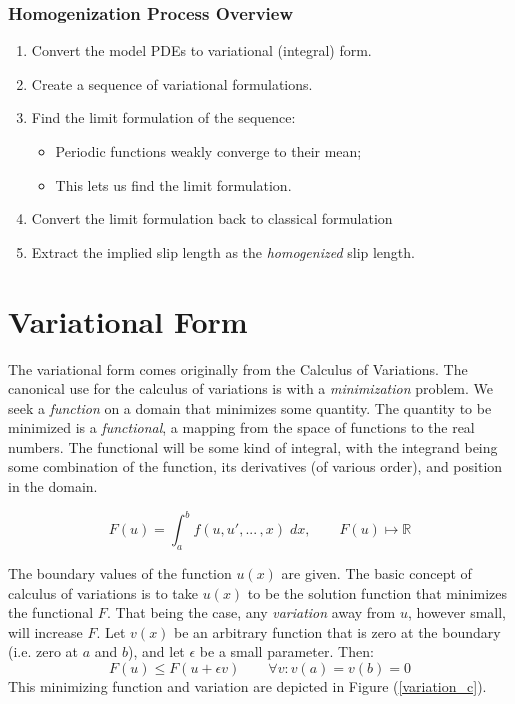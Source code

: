 \documentclass[12pt, a4paper, twoside, openright]{book}
\begin{document}
\subsubsection{Homogenization Process Overview}

\begin{enumerate}
\item Convert the model PDEs to variational (integral) form.
\item Create a sequence of variational formulations.
\item Find the limit formulation of the sequence:
\begin{itemize}
    \item Periodic functions weakly converge to their mean;
    \item This lets us find the limit formulation.
\end{itemize}
      
\item Convert the limit formulation back to classical formulation
\item Extract the implied slip length as the \emph{homogenized} slip length.
\end{enumerate}



\section{Variational Form}

The variational form comes originally from the Calculus of Variations.  The canonical use for the calculus of variations is with a \emph{minimization} problem.  We seek a \emph{function} on a domain that minimizes some quantity.  The quantity to be minimized is a \emph{functional}, a mapping from the space of functions to the real numbers.  The functional will be some kind of integral, with the integrand being some combination of the function, its derivatives (of various order), and position in the domain.

\begin{equation}
F(u) = \int_a^b f(u,u', ...\, ,x) \; dx,  \qquad F(u) \mapsto \mathbb{R}
\end{equation} 

The boundary values of the function $u(x)$ are given.  The basic concept of calculus of variations is to take $u(x)$ to be the solution function that minimizes the functional $F$.  That being the case, any \emph{variation} away from $u$, however small, will increase $F$.  Let $v(x)$ be an arbitrary function that is zero at the boundary (i.e. zero at $a$ and $b$), and let $\epsilon$ be a small parameter. Then:
\begin{equation}
F(u) \leq F(u + \epsilon v) \qquad \forall v: v(a) = v(b) = 0
\end{equation}
This minimizing function and variation are depicted in Figure (\ref{variation_c}).
\end{document}
